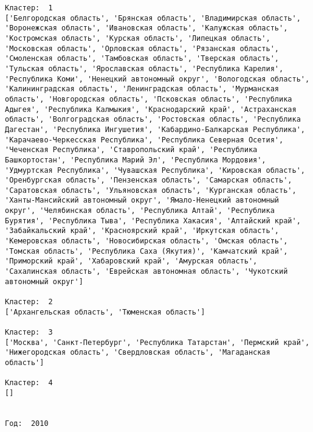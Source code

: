 \documentclass[11pt]{article}
\begin{document}
\begin{Verbatim}[commandchars=\\\{\}]
Кластер:  1
['Белгородская область', 'Брянская область', 'Владимирская область', 'Воронежская область', 'Ивановская область', 'Калужская область', 'Костромская область', 'Курская область', 'Липецкая область', 'Московская область', 'Орловская область', 'Рязанская область', 'Смоленская область', 'Тамбовская область', 'Тверская область', 'Тульская область', 'Ярославская область', 'Республика Карелия', 'Республика Коми', 'Ненецкий автономный округ', 'Вологодская область', 'Калинингpадская область', 'Ленинградская область', 'Мурманская область', 'Новгородская область', 'Псковская область', 'Республика Адыгея', 'Республика Калмыкия', 'Краснодарский край', 'Астраханская область', 'Волгоградская область', 'Ростовская область', 'Республика Дагестан', 'Республика Ингушетия', 'Кабардино-Балкарская Республика', 'Карачаево-Черкесская Республика', 'Республика Северная Осетия', 'Чеченская Республика', 'Ставропольский край', 'Республика Башкортостан', 'Республика Марий Эл', 'Республика Мордовия', 'Удмуртская Республика', 'Чувашская Республика', 'Кировская область', 'Оренбургская область', 'Пензенская область', 'Самарская область', 'Саратовская область', 'Ульяновская область', 'Курганская область', 'Ханты-Мансийский автономный округ', 'Ямало-Ненецкий автономный округ', 'Челябинская область', 'Республика Алтай', 'Республика Бурятия', 'Республика Тыва', 'Республика Хакасия', 'Алтайский край', 'Забайкальский край', 'Красноярский край', 'Иркутская область', 'Кемеровская область', 'Новосибирская область', 'Омская область', 'Томская область', 'Республика Саха (Якутия)', 'Камчатский край', 'Приморский край', 'Хабаровский край', 'Амурская область', 'Сахалинская область', 'Еврейская автономная область', 'Чукотский автономный округ']

Кластер:  2
['Архангельская область', 'Тюменская область']

Кластер:  3
['Москва', 'Санкт-Петербург', 'Республика Татарстан', 'Пермский край', 'Нижегородская область', 'Свердловская область', 'Магаданская область']

Кластер:  4
[]


Год:  2010


\end{Verbatim}
\end{document}
